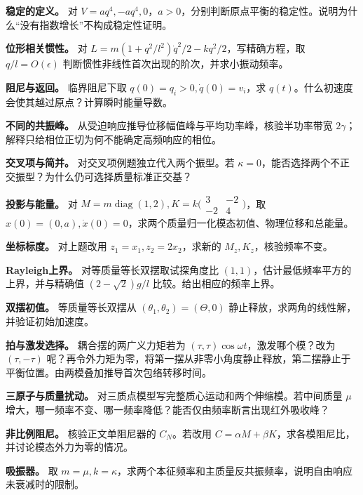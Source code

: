 \begin{bookexercises}
\item {} \textbf{稳定的定义。} 对 $V=aq^4,-aq^4,0$，$a>0$，分别判断原点平衡的稳定性。说明为什么“没有指数增长”不构成稳定性证明。
\item {} \textbf{位形相关惯性。} 对 $L=m(1+q^2/l^2)\dot q^2/2-kq^2/2$，写精确方程，取 $q/l=O(\epsilon)$ 判断惯性非线性首次出现的阶次，并求小振动频率。
\item {} \textbf{阻尼与返回。} 临界阻尼下取 $q(0)=q_i>0,\dot q(0)=v_i$，求 $q(t)$。什么初速度会使其越过原点？计算瞬时能量导数。
\item {} \textbf{不同的共振峰。} 从受迫响应推导位移幅值峰与平均功率峰，核验半功率带宽 $2\gamma$；解释只给相位正切为何不能确定高频响应的相位。
\item {} \textbf{交叉项与简并。} 对交叉项例题独立代入两个振型。若 $\kappa=0$，能否选择两个不正交振型？为什么仍可选择质量标准正交基？
\item {} \textbf{投影与能量。} 对 $M=m\operatorname{diag}(1,2),K=k\bigl(\begin{smallmatrix}3&-2\\-2&4\end{smallmatrix}\bigr)$，取 $x(0)=(0,a),\dot x(0)=0$，求两个质量归一化模态初值、物理位移和总能量。
\item {} \textbf{坐标标度。} 对上题改用 $z_1=x_1,z_2=2x_2$，求新的 $M_z,K_z$，核验频率不变。
\item {} \textbf{Rayleigh上界。} 对等质量等长双摆取试探角度比 $(1,1)$，估计最低频率平方的上界，并与精确值 $(2-\sqrt2)g/l$ 比较。给出相应的频率上界。
\item {} \textbf{双摆初值。} 等质量等长双摆从 $(\theta_1,\theta_2)=(\Theta,0)$ 静止释放，求两角的线性解，并验证初始加速度。
\item {} \textbf{拍与激发选择。} 耦合摆的两广义力矩若为 $(\tau,\tau)\cos\omega t$，激发哪个模？改为 $(\tau,-\tau)$ 呢？再令外力矩为零，将第一摆从非零小角度静止释放，第二摆静止于平衡位置。由两模叠加推导首次包络转移时间。
\item {} \textbf{三原子与质量扰动。} 对三质点模型写完整质心运动和两个伸缩模。若中间质量 $\mu$ 增大，哪一频率不变、哪一频率降低？能否仅由频率断言出现红外吸收峰？
\item {} \textbf{非比例阻尼。} 核验正文单阻尼器的 $C_N$。若改用 $C=\alpha M+\beta K$，求各模阻尼比，并讨论模态外力为零的情况。
\item {} \textbf{吸振器。} 取 $m=\mu,k=\kappa$，求两个本征频率和主质量反共振频率，说明自由响应未衰减时的限制。

\end{bookexercises}

